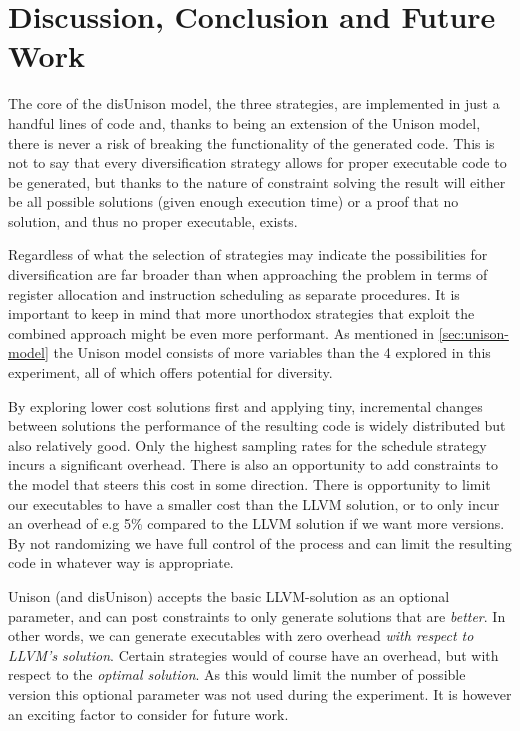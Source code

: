 \chapter{Discussion, Conclusion and Future Work}
\label{chapter:discussion}

The core of the disUnison model, the three strategies, are implemented in just a handful
lines of code and, thanks to being an extension of the Unison model, there is never a risk
of breaking the functionality of the generated code. This is not to say that every
diversification strategy allows for proper executable code to be generated, but thanks to
the nature of constraint solving the result will either be all possible solutions
(given enough execution time) or a proof that no solution, and thus no proper executable,
exists.

Regardless of what the selection of strategies may indicate the possibilities for
diversification are far broader than when approaching the problem in terms of register
allocation and instruction scheduling as separate procedures. It is important to keep in
mind that more unorthodox strategies that exploit the combined approach might be even
more performant. As mentioned in \ref{sec:unison-model} the Unison model consists of more
variables than the 4 explored in this experiment, all of which offers potential for
diversity.

By exploring lower cost solutions first and applying tiny, incremental changes between
solutions the performance of the resulting code is widely distributed but also relatively
good. Only the highest sampling rates for the schedule strategy incurs a significant
overhead. There is also an opportunity to add constraints to the model that steers this
cost in some direction. There is opportunity to limit our executables to have a smaller cost
than the LLVM solution, or to only incur an overhead of e.g 5\% compared to the LLVM
solution if we want more versions. By not randomizing we have full control of the process
and can limit the resulting code in whatever way is appropriate.

Unison (and disUnison) accepts the basic LLVM-solution as an optional parameter, and can
post constraints to only generate solutions that are \textit{better}. In other words, we
can generate executables with zero overhead \textit{with respect to LLVM's solution}.
Certain strategies would of course have an overhead, but with respect to the
\textit{optimal solution}. As this would limit the number of possible version this
optional parameter was not used during the experiment. It is however an exciting factor to
consider for future work.

